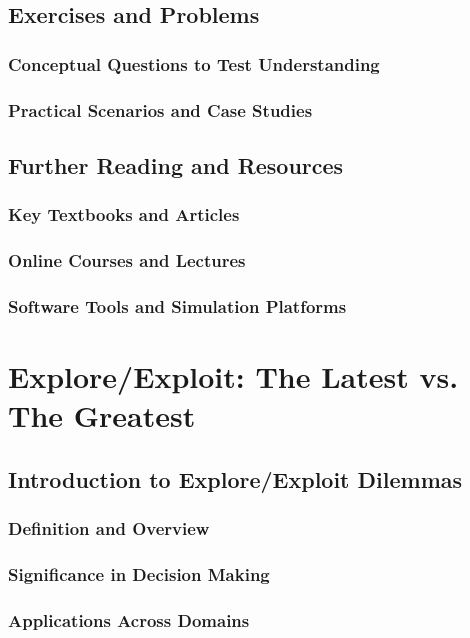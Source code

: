 \documentclass[12pt]{book} %
\begin{document}
\section{Exercises and Problems}
\subsection{Conceptual Questions to Test Understanding}
\subsection{Practical Scenarios and Case Studies}

\section{Further Reading and Resources}
\subsection{Key Textbooks and Articles}
\subsection{Online Courses and Lectures}
\subsection{Software Tools and Simulation Platforms}

\chapter{Explore/Exploit: The Latest vs. The Greatest}

\section{Introduction to Explore/Exploit Dilemmas}
\subsection{Definition and Overview}
\subsection{Significance in Decision Making}
\subsection{Applications Across Domains}
\end{document}
